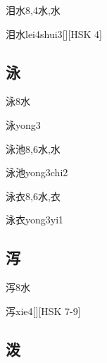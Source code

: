 \begin{Entry}{泪水}{8,4}{⽔,⽔}
  \begin{Phonetics}{泪水}{lei4shui3}[][HSK 4]
  \end{Phonetics}
\end{Entry}

\subsection*{泳}

\begin{Entry}{泳}{8}{⽔}
  \begin{Phonetics}{泳}{yong3}
  \end{Phonetics}
\end{Entry}

\begin{Entry}{泳池}{8,6}{⽔,⽔}
  \begin{Phonetics}{泳池}{yong3chi2}
  \end{Phonetics}
\end{Entry}

\begin{Entry}{泳衣}{8,6}{⽔,⾐}
  \begin{Phonetics}{泳衣}{yong3yi1}
  \end{Phonetics}
\end{Entry}

\subsection*{泻}

\begin{Entry}{泻}{8}{⽔}
  \begin{Phonetics}{泻}{xie4}[][HSK 7-9]
  \end{Phonetics}
\end{Entry}

\subsection*{泼}

